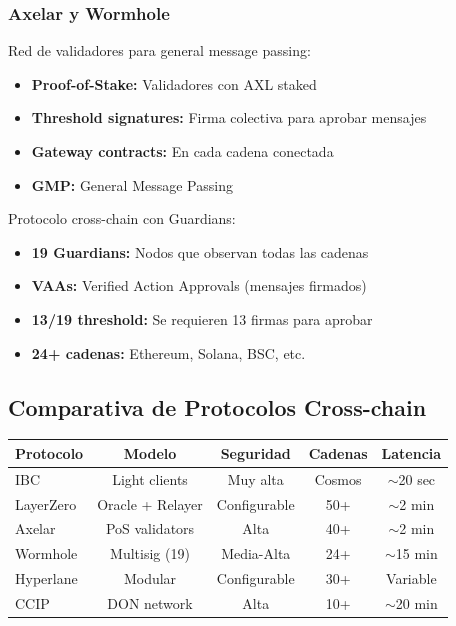 \documentclass[11pt,a4paper,twoside]{book}
\begin{document}
\subsubsection{Axelar y Wormhole}

\begin{definition}[Axelar]
Red de validadores para general message passing:
\begin{itemize}
    \item \textbf{Proof-of-Stake:} Validadores con AXL staked
    \item \textbf{Threshold signatures:} Firma colectiva para aprobar mensajes
    \item \textbf{Gateway contracts:} En cada cadena conectada
    \item \textbf{GMP:} General Message Passing
\end{itemize}
\end{definition}

\begin{definition}[Wormhole]
Protocolo cross-chain con Guardians:
\begin{itemize}
    \item \textbf{19 Guardians:} Nodos que observan todas las cadenas
    \item \textbf{VAAs:} Verified Action Approvals (mensajes firmados)
    \item \textbf{13/19 threshold:} Se requieren 13 firmas para aprobar
    \item \textbf{24+ cadenas:} Ethereum, Solana, BSC, etc.
\end{itemize}
\end{definition}

\subsection{Comparativa de Protocolos Cross-chain}

\begin{center}
\begin{tabular}{lcccc}
\toprule
\textbf{Protocolo} & \textbf{Modelo} & \textbf{Seguridad} & \textbf{Cadenas} & \textbf{Latencia} \\
\midrule
IBC & Light clients & Muy alta & Cosmos & $\sim$20 sec \\
LayerZero & Oracle + Relayer & Configurable & 50+ & $\sim$2 min \\
Axelar & PoS validators & Alta & 40+ & $\sim$2 min \\
Wormhole & Multisig (19) & Media-Alta & 24+ & $\sim$15 min \\
Hyperlane & Modular & Configurable & 30+ & Variable \\
CCIP & DON network & Alta & 10+ & $\sim$20 min \\
\bottomrule
\end{tabular}
\end{center}
\end{document}
